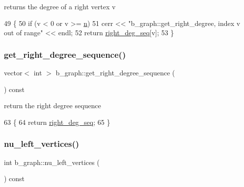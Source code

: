 returns the degree of a right vertex v 


\begin{DoxyCode}
49 \{
50   \textcolor{keywordflow}{if} (v < 0 or v >= \hyperlink{classb__graph_a9e211d40c1799bc9b125de472ff06642}{n})
51     cerr << \textcolor{stringliteral}{"b\_graph::get\_right\_degree, index v out of range"} << endl;
52   \textcolor{keywordflow}{return} \hyperlink{classb__graph_ae4c875ed6a583a78f38dfe958f20fad5}{right\_deg\_seq}[v];
53 \}
\end{DoxyCode}
\mbox{\label{classb__graph_a2711566385b92b02f4c03abdc1f9a582}} 
\subsubsection{\texorpdfstring{get\+\_\+right\+\_\+degree\+\_\+sequence()}{get\_right\_degree\_sequence()}}
{\footnotesize\ttfamily vector$<$ int $>$ b\+\_\+graph\+::get\+\_\+right\+\_\+degree\+\_\+sequence (\begin{DoxyParamCaption}{ }\end{DoxyParamCaption}) const}



return the right degree sequence 


\begin{DoxyCode}
63 \{
64   \textcolor{keywordflow}{return} \hyperlink{classb__graph_ae4c875ed6a583a78f38dfe958f20fad5}{right\_deg\_seq};
65 \}
\end{DoxyCode}
\mbox{\label{classb__graph_a5e71d5c97f2501b0b93c17146cf7e68e}} 
\subsubsection{\texorpdfstring{nu\+\_\+left\+\_\+vertices()}{nu\_left\_vertices()}}
{\footnotesize\ttfamily int b\+\_\+graph\+::nu\+\_\+left\+\_\+vertices (\begin{DoxyParamCaption}{ }\end{DoxyParamCaption}) const}



